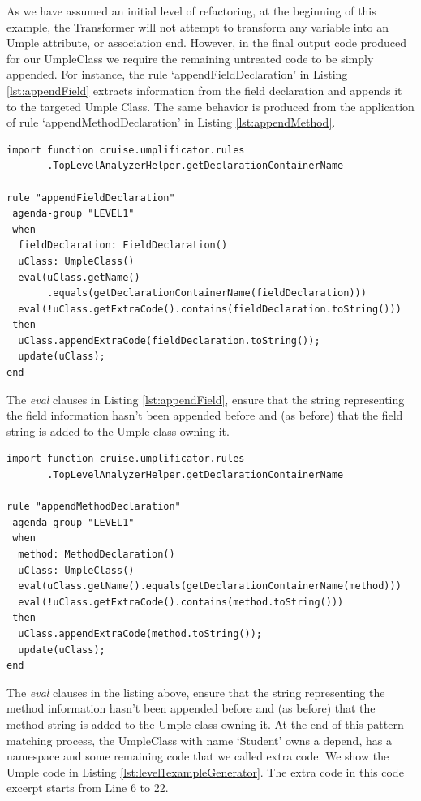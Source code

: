 As we have assumed an initial level of refactoring, at the beginning of this example, the Transformer will not attempt to transform any variable into an Umple attribute, or association end. However, in the final output code produced for our UmpleClass we require the remaining untreated code to be simply appended. For instance, the rule `appendFieldDeclaration' in Listing \ref{lst:appendField} extracts information from the field declaration and appends it to the targeted Umple Class. The same behavior is produced from the application of rule `appendMethodDeclaration' in Listing \ref{lst:appendMethod}.

\begin{lstlisting}[language={drools},label={lst:appendField}, caption=Rule appendFieldDeclaration]
import function cruise.umplificator.rules
       .TopLevelAnalyzerHelper.getDeclarationContainerName
       
rule "appendFieldDeclaration"
 agenda-group "LEVEL1" 
 when
  fieldDeclaration: FieldDeclaration()
  uClass: UmpleClass()
  eval(uClass.getName()
       .equals(getDeclarationContainerName(fieldDeclaration)))
  eval(!uClass.getExtraCode().contains(fieldDeclaration.toString()))
 then
  uClass.appendExtraCode(fieldDeclaration.toString());
  update(uClass);
end
\end{lstlisting}

The \textit{eval} clauses in Listing \ref{lst:appendField}, ensure that the string representing the field information hasn't been appended before and (as before) that the field string is added to the Umple class owning it.

\begin{lstlisting}[language={drools},label={lst:appendMethod}, caption=Rule appendMethodDeclaration]
import function cruise.umplificator.rules
       .TopLevelAnalyzerHelper.getDeclarationContainerName
       
rule "appendMethodDeclaration"
 agenda-group "LEVEL1" 
 when
  method: MethodDeclaration()
  uClass: UmpleClass()
  eval(uClass.getName().equals(getDeclarationContainerName(method)))
  eval(!uClass.getExtraCode().contains(method.toString()))
 then
  uClass.appendExtraCode(method.toString());
  update(uClass);
end
\end{lstlisting}

The \textit{eval} clauses in the listing above, ensure that the string representing the method information hasn't been appended before and (as before) that the method string is added to the Umple class owning it. 
At the end of this pattern matching process, the UmpleClass with name `Student' owns a depend, has a namespace and some remaining code that we called extra code. We show the Umple code in Listing \ref{lst:level1exampleGenerator}. The extra code in this code excerpt starts from Line 6 to 22.

